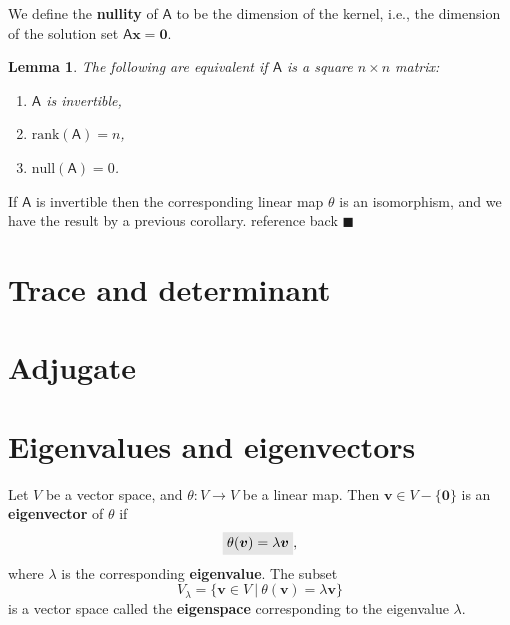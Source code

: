 \documentclass[letter-paper]{tufte-book}
\newtheorem{lemma}[theorem]{\color{pastel-blue}Lemma}
\newenvironment{proof}[1][Proof]{\begin{trivlist}
\item[\hskip \labelsep {\bfseries #1}]}{\end{trivlist}}
\newcommand{\As}{{\mathsf{A}}}
\newcommand{\Ob}{{\boldsymbol{0}}}
\newcommand{\vb}{{\boldsymbol{v}}}
\newcommand{\xb}{{\boldsymbol{x}}}
\newcommand{\qed}{\hfill$\blacksquare$}
\newcommand{\highlight}[1]{\mathchoice%
  {\colorbox{black!10}{$\displaystyle#1$}}%
  {\colorbox{black!10}{$\textstyle#1$}}%
  {\colorbox{black!10}{$\scriptstyle#1$}}%
  {\colorbox{black!10}{$\scriptscriptstyle#1$}}}%
\begin{document}
We define the \textbf{nullity} of $\As$ to be the dimension of the kernel, i.e.,
the dimension of the solution set $\As\xb = \Ob$.

\begin{lemma}
  The following are equivalent if $\As$ is a square $n\times n$ matrix:
  \begin{enumerate}
    \item $\As$ is invertible,
    \item $\mbox{rank}(\As) = n$,
    \item $\mbox{null}(\As) = 0$.
  \end{enumerate}
\end{lemma}

\begin{proof}
  If $\As$ is invertible then the corresponding linear map $\theta$ is an
  isomorphism, and we have the result by a previous corollary.
  {\color{red}reference back} \qed
\end{proof}


\section{Trace and determinant}


\section{Adjugate}


\section{Eigenvalues and eigenvectors}

Let $V$ be a vector space, and $\theta:V \to V$ be a linear map. Then $\vb\in
V-\{\Ob\}$ is an \textbf{eigenvector} of $\theta$ if
\begin{equation}
  \highlight{\theta(\vb) = \lambda \vb},
\end{equation}
where $\lambda$ is the corresponding \textbf{eigenvalue}. The subset
\begin{equation}
  V_{\lambda} = \{\vb\in V \ |\ \theta(\vb) = \lambda \vb\}
\end{equation}
is a vector space called the \textbf{eigenspace} corresponding to the eigenvalue
$\lambda$.
\end{document}
